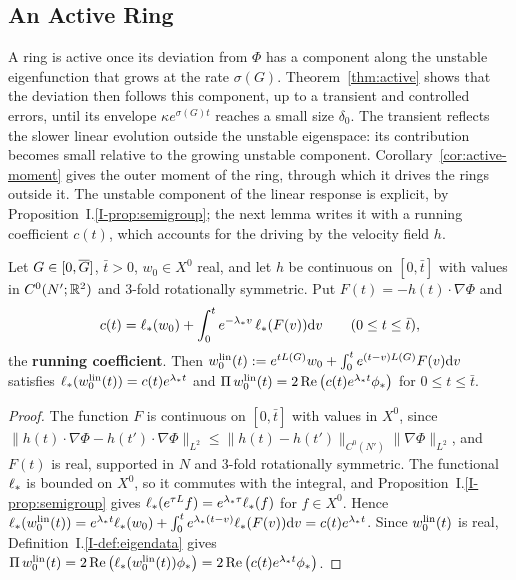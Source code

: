 \subsection{An Active Ring}

A ring is active once its deviation from $\Phi$ has a component along the
unstable eigenfunction that grows at the rate $\sigma(G)$. Theorem~\ref{thm:active}
shows that the deviation then follows this component, up to a transient and
controlled errors, until its envelope $\kappa e^{\sigma(G)t}$ reaches a small
size $\delta_0$. The transient reflects the slower linear evolution outside
the unstable eigenspace: its contribution becomes small relative to the
growing unstable component.
Corollary~\ref{cor:active-moment} gives the outer moment of the ring, through
which it drives the rings outside it. The unstable component of the linear
response is explicit, by Proposition~I.\ref{I-prop:semigroup}; the next lemma
writes it with a running coefficient $c(t)$, which accounts for the driving by
the velocity field $h$.

\begin{lemma}
\label{lem:running}
Let $G\in[0,\overline{G}]$, $\bar t>0$, $w_0\in X^0$ real, and let $h$ be continuous on
$[0,\bar t]$ with values in $C^0(N';\mathbb{R}^2)$ and $3$-fold rotationally symmetric. Put
$F(t)=-h(t)\cdot\nabla\Phi$ and
\begin{equation}
\label{eq:running}
c(t)=\ell_*(w_0)+\int_0^te^{-\lambda_* v}\,\ell_*(F(v))\dd v\qquad(0\le t\le\bar t),
\end{equation}
the \textbf{running coefficient}. Then
$w^{\mathrm{lin}}_0(t):=e^{tL(G)}w_0+\int_0^te^{(t-v)L(G)}F(v)\dd v$ satisfies
$\ell_*(w^{\mathrm{lin}}_0(t))=c(t)e^{\lambda_* t}$ and
$\Pi\,w^{\mathrm{lin}}_0(t)=2\Re\big(c(t)e^{\lambda_* t}\phi_*\big)$ for $0\le t\le\bar t$.
\end{lemma}
\begin{proof}
The function $F$ is continuous on $[0,\bar t]$ with values in $X^0$, since
$\|h(t)\cdot\nabla\Phi-h(t')\cdot\nabla\Phi\|_{L^2}\le\|h(t)-h(t')\|_{C^0(N')}\|\nabla\Phi\|_{L^2}$,
and $F(t)$ is real, supported in $N$ and $3$-fold rotationally symmetric. The functional
$\ell_*$ is bounded on $X^0$, so it commutes with the integral, and
Proposition~I.\ref{I-prop:semigroup} gives $\ell_*(e^{\tau L}f)=e^{\lambda_*\tau}\ell_*(f)$
for $f\in X^0$. Hence
$\ell_*(w^{\mathrm{lin}}_0(t))=e^{\lambda_* t}\ell_*(w_0)+\int_0^te^{\lambda_*(t-v)}\ell_*(F(v))\dd v=c(t)e^{\lambda_* t}$.
Since $w^{\mathrm{lin}}_0(t)$ is real, Definition~I.\ref{I-def:eigendata} gives
$\Pi\,w^{\mathrm{lin}}_0(t)=2\Re\big(\ell_*(w^{\mathrm{lin}}_0(t))\phi_*\big)=2\Re\big(c(t)e^{\lambda_* t}\phi_*\big)$.
\end{proof}

